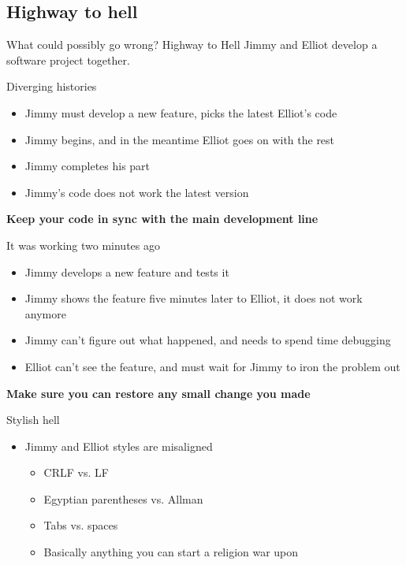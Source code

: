 \documentclass[presentation]{beamer}
\begin{document}
\subsection{Highway to hell}

\newcommand{\baddev}[0]{Jimmy}
\newcommand{\gooddev}[0]{Elliot}

\begin{frame}{What could possibly go wrong? Highway to Hell }
	\baddev{} \cite{jargon} and \gooddev{} develop a software project together.
	\begin{block}{Diverging histories}
		\begin{itemize}
			\item \baddev{} must develop a new feature, picks the latest \gooddev{}'s code
			\item \baddev{} begins, and in the meantime \gooddev{} goes on with the rest
			\item \baddev{} completes his part
			\item \baddev{}'s code does not work the latest version
		\end{itemize}
		\textbf{Keep your code in sync with the main development line}
	\end{block}
	\begin{block}{It was working two minutes ago}
		\begin{itemize}
			\item \baddev{} develops a new feature and tests it
			\item \baddev{} shows the feature five minutes later to \gooddev{}, it does not work anymore
			\item \baddev{} can't figure out what happened, and needs to spend time debugging
			\item \gooddev{} can't see the feature, and must wait for \baddev{} to iron the problem out
		\end{itemize}
		\textbf{Make sure you can restore any small change you made}
	\end{block}
	\begin{block}{Stylish hell}
		\begin{itemize}
			\item \baddev{} and \gooddev{} styles are misaligned
			\begin{itemize}
				\item CRLF vs. LF
				\item Egyptian parentheses \cite{jargon} vs. Allman
				\item Tabs vs. spaces
				\item Basically anything you can start a religion war upon

\end{itemize}
\end{itemize}
\end{block}
\end{frame}
\end{document}
